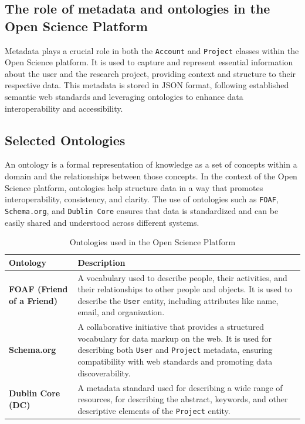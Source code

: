 \documentclass{article}
\begin{document}
\subsection{The role of metadata and ontologies in the Open Science Platform}

Metadata plays a crucial role in both the \texttt{Account} and \texttt{Project} classes within the Open Science platform. It is used to capture and represent essential information about the user and the research project, providing context and structure to their respective data. This metadata is stored in JSON format, following established semantic web standards and leveraging ontologies to enhance data interoperability and accessibility.


\subsection{Selected Ontologies}
An ontology is a formal representation of knowledge as a set of concepts within a domain and the relationships between those concepts. In the context of the Open Science platform, ontologies help structure data in a way that promotes interoperability, consistency, and clarity. The use of ontologies such as \texttt{FOAF}, \texttt{Schema.org}, and \texttt{Dublin Core} ensures that data is standardized and can be easily shared and understood across different systems.

\begin{table}[h]
      \centering
      \label{tab:ontologies}
      \renewcommand{\arraystretch}{1.2}
      \begin{tabularx}{\textwidth}{|l|X|}            \hline
            \textbf{Ontology}                  & \textbf{Description}                                                                                                                                                                                                                                   \\ \hline
            \textbf{FOAF (Friend of a Friend)} & A vocabulary used to describe people, their activities, and their relationships to other people and objects. It is used to describe the \texttt{User} entity, including attributes like name, email, and organization.                                 \\ \hline
            \textbf{Schema.org}                & A collaborative initiative that provides a structured vocabulary for data markup on the web. It is used for describing both \texttt{User} and \texttt{Project} metadata, ensuring compatibility with web standards and promoting data discoverability. \\ \hline
            \textbf{Dublin Core (DC)}          & A metadata standard used for describing a wide range of resources, for describing the abstract, keywords, and other descriptive elements of the \texttt{Project} entity.                                                                               \\ \hline
      \end{tabularx}
      \caption{Ontologies used in the Open Science Platform}
\end{table}
\end{document}
